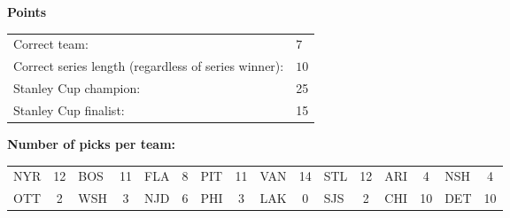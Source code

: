 \documentclass[10pt]{article}
\begin{document}
{\bf Points}\\
\begin{minipage}{12cm}
    \begin{tabular}{l l}
        Correct team:	& $7$\\
        Correct series length (regardless of series winner):	& $10$\\
        Stanley Cup champion:	& 25\\
        Stanley Cup finalist:	& 15\\
    \end{tabular}

    \vspace{1cm}
    {\bf Number of picks per team:}\\
    \begin{tabular}{lc | lc | lc | lc | lc | lc | lc | lc }
        NYR & 12 & BOS & 11 & FLA & 8 & PIT & 11 & VAN & 14 & STL & 12 & ARI & 4 & NSH & 4 \\
        OTT & 2 & WSH & 3 & NJD & 6 & PHI & 3 & LAK & 0 & SJS & 2 & CHI & 10 & DET & 10 \\
    \end{tabular}
\end{minipage}
\end{document}
